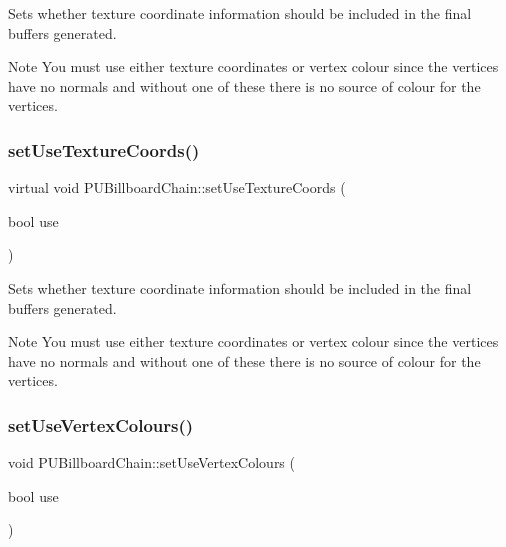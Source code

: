 Sets whether texture coordinate information should be included in the final buffers generated. \begin{DoxyNote}{Note}
You must use either texture coordinates or vertex colour since the vertices have no normals and without one of these there is no source of colour for the vertices. 
\end{DoxyNote}
\mbox{\label{classPUBillboardChain_a21246c9c1acfe3e89f0c74f9057bc2ba}} 
\subsubsection{\texorpdfstring{set\+Use\+Texture\+Coords()}{setUseTextureCoords()}\hspace{0.1cm}{\footnotesize\ttfamily [2/2]}}
{\footnotesize\ttfamily virtual void P\+U\+Billboard\+Chain\+::set\+Use\+Texture\+Coords (\begin{DoxyParamCaption}\item[{bool}]{use }\end{DoxyParamCaption})\hspace{0.3cm}{\ttfamily [virtual]}}

Sets whether texture coordinate information should be included in the final buffers generated. \begin{DoxyNote}{Note}
You must use either texture coordinates or vertex colour since the vertices have no normals and without one of these there is no source of colour for the vertices. 
\end{DoxyNote}
\mbox{\label{classPUBillboardChain_afe38aa42454cf7329ed5c9c4a808a4ad}} 
\subsubsection{\texorpdfstring{set\+Use\+Vertex\+Colours()}{setUseVertexColours()}\hspace{0.1cm}{\footnotesize\ttfamily [1/2]}}
{\footnotesize\ttfamily void P\+U\+Billboard\+Chain\+::set\+Use\+Vertex\+Colours (\begin{DoxyParamCaption}\item[{bool}]{use }\end{DoxyParamCaption})\hspace{0.3cm}{\ttfamily [virtual]}}

